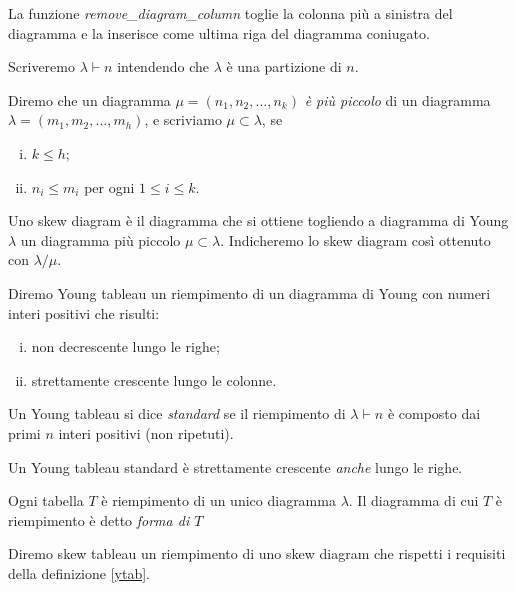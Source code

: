 La funzione \emph{remove\_diagram\_column} toglie la colonna pi\`u a
sinistra del diagramma e la inserisce come ultima riga del diagramma coniugato.

\begin{notaz}
Scriveremo $\lambda \vdash n$ intendendo che $\lambda$ \`e una
partizione di $n$.
\end{notaz}

\begin{defn}
Diremo che un diagramma $\mu=(n_1,n_2,\dots,n_k)$ \emph{\`e pi\`u
piccolo} di un diagramma $\lambda=(m_1,m_2,\dots,m_h)$, e scriviamo
$\mu \subset \lambda$, se
\begin{enumerate}[(i)]
\item $k \leq h$;
\item $n_i \leq m_i$ per ogni $1 \leq i \leq k$.
\end{enumerate}
\end{defn}

\begin{defn}
Uno skew diagram \`e il diagramma che si ottiene togliendo a
diagramma di Young $\lambda$ un diagramma pi\`u piccolo $\mu \subset
\lambda$. Indicheremo lo skew diagram cos\`i ottenuto con $\lambda / \mu$.
\end{defn}

\begin{defn}\label{ytab}
Diremo Young tableau un riempimento di un diagramma di Young con
numeri interi positivi che risulti:
\begin{enumerate}[(i)]
\item non decrescente lungo le righe;
\item strettamente crescente lungo le colonne.
\end{enumerate}
Un Young tableau si dice \emph{standard} se il riempimento di
$\lambda \vdash n$ \`e composto dai primi $n$ interi positivi (non
ripetuti).
\end{defn}

\begin{oss}
Un Young tableau standard \`e strettamente crescente \emph{anche}
lungo le righe.
\end{oss}

\begin{oss}
Ogni tabella $T$ \`e riempimento di un unico diagramma $\lambda$. Il
diagramma di cui $T$ \`e riempimento \`e detto \emph{forma di $T$}
\end{oss}

\begin{defn}
Diremo skew tableau un riempimento di uno skew diagram che rispetti i
requisiti della definizione \ref{ytab}. 
\end{defn}

